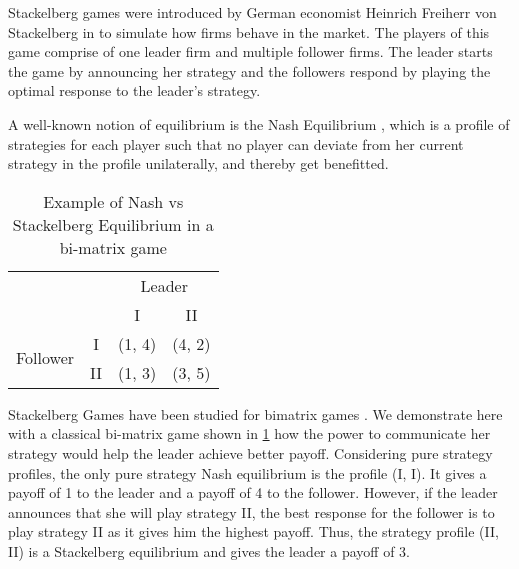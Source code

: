 
Stackelberg games were introduced by German economist Heinrich Freiherr von Stackelberg in \cite{S34} to simulate how firms behave in the market. The players of this game comprise of one leader firm and multiple follower firms. The leader starts the game by announcing her strategy and the followers respond by playing the optimal response to the leader's strategy.

A well-known notion of equilibrium is the Nash Equilibrium \cite{Nash50}, which is a profile of strategies for each player such that no player can deviate from her current strategy in the profile unilaterally, and thereby get benefitted.

\begin{table}[]
    \centering
    \begin{tabular}{ll|c|c|}
        \cline{3-4}
        & & \multicolumn{2}{c|}{Leader} \\ 
        \cline{3-4} 
        & & I & II \\ 
        \hline
        \multicolumn{1}{|c|}{\multirow{2}{*}{Follower}} & \multicolumn{1}{c|}{I}  & (1, 4) & (4, 2)\\ 
        \cline{2-4} 
        \multicolumn{1}{|c|}{} & \multicolumn{1}{c|}{II} & (1, 3) & (3, 5) \\
        \hline
    \end{tabular}
    \caption{Example of Nash vs Stackelberg Equilibrium in a bi-matrix game}
    \label{tab:bi-matrix-game}
\end{table}

Stackelberg Games have been studied for bimatrix games \cite{GS18}. We demonstrate here with a classical bi-matrix game shown in \cref{tab:bi-matrix-game} how the power to communicate her strategy would help the leader achieve better payoff. Considering pure strategy profiles, the only pure strategy Nash equilibrium is the profile (I, I). It gives a payoff of 1 to the leader and a payoff of 4 to the follower. However, if the leader announces that she will play strategy II, the best response for the follower is to play strategy II as it gives him the highest payoff. Thus, the strategy profile (II, II) is a Stackelberg equilibrium and gives the leader a payoff of 3.

